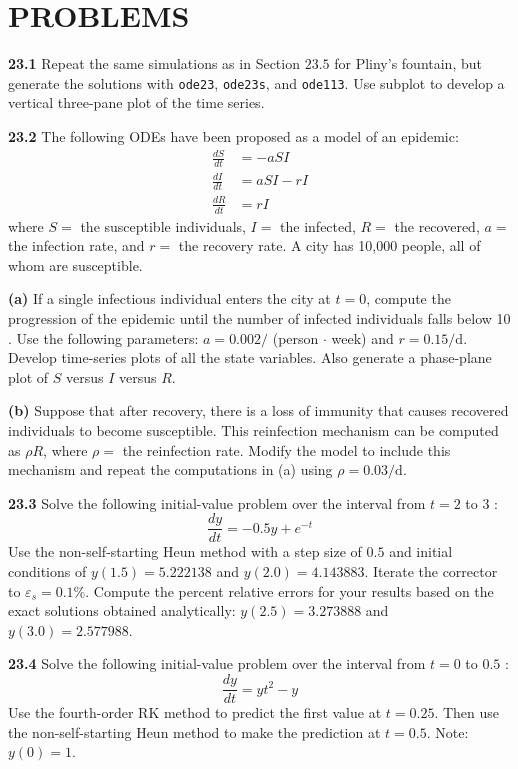 \documentclass[../main.tex]{subfiles}
\begin{document}
\section{PROBLEMS}

\noindent \textbf{23.1} Repeat the same simulations as in Section $23.5$ for Pliny's fountain, but generate the solutions with \texttt{ode23}, \texttt{ode23s}, and \texttt{ode113}. Use subplot to develop a vertical three-pane plot of the time series.\vspace{2mm}

\noindent \textbf{23.2} The following ODEs have been proposed as a model of an epidemic:
$$
\begin{aligned}
\frac{d S}{d t} &=-a S I \\
\frac{d I}{d t} &=a S I-r I \\
\frac{d R}{d t} &=r I
\end{aligned}
$$
where $S=$ the susceptible individuals, $I=$ the infected, $R=$ the recovered, $a=$ the infection rate, and $r=$ the recovery rate. A city has 10,000 people, all of whom are susceptible.

\noindent\textbf{(a)} If a single infectious individual enters the city at $t=0$, compute the progression of the epidemic until the number of infected individuals falls below 10 . Use the following parameters: $a=0.002 /$ (person $\cdot$ week) and $r=0.15 / \mathrm{d}$. Develop time-series plots of all the state variables. Also generate a phase-plane plot of $S$ versus $I$ versus $R$.

\noindent\textbf{(b)} Suppose that after recovery, there is a loss of immunity that causes recovered individuals to become susceptible. This reinfection mechanism can be computed as $\rho R$, where $\rho=$ the reinfection rate. Modify the model to include this mechanism and repeat the computations in (a) using $\rho=0.03 / \mathrm{d}$.\vspace{2mm}

\noindent \textbf{23.3} Solve the following initial-value problem over the interval from $t=2$ to 3 :
$$
\frac{d y}{d t}=-0.5 y+e^{-t}
$$
Use the non-self-starting Heun method with a step size of $0.5$ and initial conditions of $y(1.5)=5.222138$ and $y(2.0)=4.143883$. Iterate the corrector to $\varepsilon_{s}=0.1 \%$. Compute the percent relative errors for your results based on the exact solutions obtained analytically: $y(2.5)=3.273888$ and $y(3.0)=2.577988$.\vspace{2mm}

\noindent \textbf{23.4} Solve the following initial-value problem over the interval from $t=0$ to $0.5$ :
$$
\frac{d y}{d t}=y t^{2}-y
$$
Use the fourth-order RK method to predict the first value at $t=0.25$. Then use the non-self-starting Heun method to make the prediction at $t=0.5$. Note: $y(0)=1$.\vspace{2mm}
\end{document}
